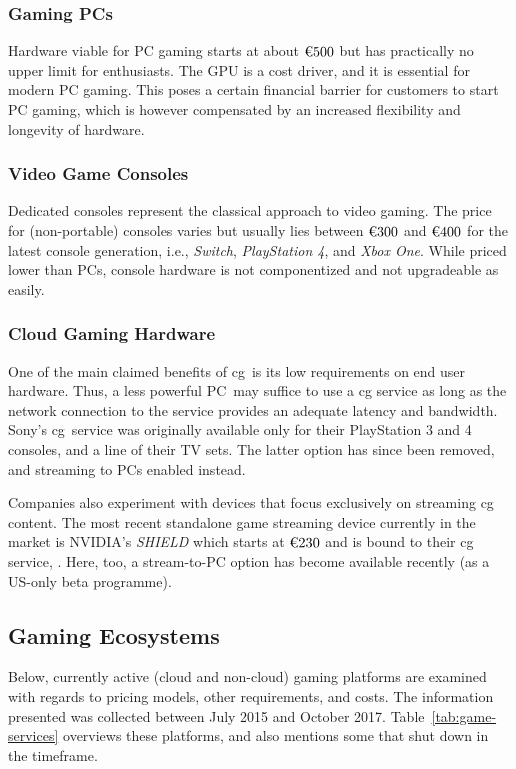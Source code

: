 \subsubsection{Gaming \acrshort{PC}s}
Hardware viable for \gls{PC} gaming starts at about $\text{\texteuro} 500$ but
has practically no upper limit for enthusiasts. The \gls{GPU}
is a cost driver, and it is essential for modern \gls{PC} gaming.
This poses a certain financial barrier for customers to start \gls{PC} gaming,
which is however compensated by an increased flexibility and longevity of
hardware.

\subsubsection{Video Game Consoles}
Dedicated consoles represent the classical approach to video gaming.
The price for (non-portable) consoles varies but usually lies between
$\text{\texteuro} 300$ and $\text{\texteuro} 400$ for the latest console
generation, i.e., \textit{Switch}, \textit{PlayStation 4}, and
\textit{Xbox One}.
While priced lower than \glspl{PC}, console hardware is not componentized
and not upgradeable as easily.

\subsubsection{Cloud Gaming Hardware}
One of the main claimed benefits of \gls{cg} is its low requirements
on end user hardware. Thus, a less powerful \gls{PC} may suffice to
use a \gls{cg} service as long as the network connection to the
service provides an adequate latency and bandwidth.
Sony's \psnow \gls{cg} service was originally available only for their
PlayStation 3 and 4 consoles, and a line of their TV sets. The latter
option has since been removed, and streaming to \glspl{PC} enabled
instead.

Companies also experiment with devices that focus exclusively on streaming
\gls{cg} content. The most recent standalone game streaming device currently
in the market is NVIDIA's \textit{SHIELD} which starts at
$\text{\texteuro} 230$ and is bound to their \gls{cg} service, \gfnow.
Here, too, a stream-to-\gls{PC} option has become available recently
(as a US-only beta programme).



\subsection{Gaming Ecosystems}
Below, currently active (cloud and non-cloud) gaming platforms are examined
with regards to pricing models, other requirements, and costs. The
information presented was collected between July 2015 and October 2017.
Table~\ref{tab:game-services} overviews these platforms, and also
mentions some that shut down in the timeframe.

